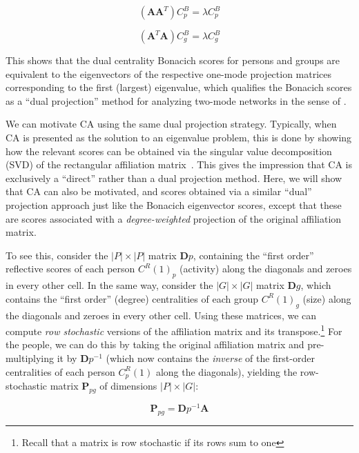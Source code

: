 \documentclass[a4paper,fleqn]{cas-sc}
\begin{document}
\begin{equation}
    \left(\mathbf{AA}^T\right)C^B_p = \lambda C^B_p
    \label{eq:bon3}
\end{equation}

\begin{equation}
    \left(\mathbf{A}^T\mathbf{A}\right)C^B_g = \lambda C^B_g
    \label{eq:bon4}
\end{equation}

This shows that the dual centrality Bonacich scores for persons and groups are equivalent to the eigenvectors of the respective one-mode projection matrices corresponding to the first (largest) eigenvalue, which qualifies the Bonacich scores as a ``dual projection'' method for analyzing two-mode networks in the sense of \citet{everett2013dual}.

We can motivate CA using the same dual projection strategy. Typically, when CA is presented as the solution to an eigenvalue problem, this is done by showing how the relevant scores can be obtained via the singular value decomposition (SVD) of the rectangular affiliation matrix~\citep{borgatti1997network, bonacich1991simultaneous, faust1997centrality, faust2005using}. This gives the impression that CA is exclusively a ``direct'' rather than a dual projection method. Here, we will show that CA can also be motivated, and scores obtained via a similar ``dual'' projection approach just like the Bonacich eigenvector scores, except that these are scores associated with a \textit{degree-weighted} projection of the original affiliation matrix.

To see this, consider the $|P| \times |P|$ matrix $\mathbf{D}p$, containing the ``first order'' reflective scores of each person $C^R(1)_p$ (activity) along the diagonals and zeroes in every other cell. In the same way, consider the $|G| \times |G|$ matrix $\mathbf{D}g$, which contains the ``first order'' (degree) centralities of each group $C^R(1)_g$ (size) along the diagonals and zeroes in every other cell. Using these matrices, we can compute \textit{row stochastic} versions of the affiliation matrix and its transpose.\footnote{Recall that a matrix is row stochastic if its rows sum to one} For the people, we can do this by taking the original affiliation matrix and pre-multiplying it by $\mathbf{D}p^{-1}$ (which now contains the \textit{inverse} of the first-order centralities of each person $C^R_p(1)$ along the diagonals), yielding the row-stochastic matrix $\mathbf{P}_{pg}$ of dimensions $|P| \times |G|$:

\begin{equation}
    \mathbf{P}_{pg} = \mathbf{D}p^{-1}\mathbf{A}
    \label{eq:ca1}
\end{equation}
\end{document}
